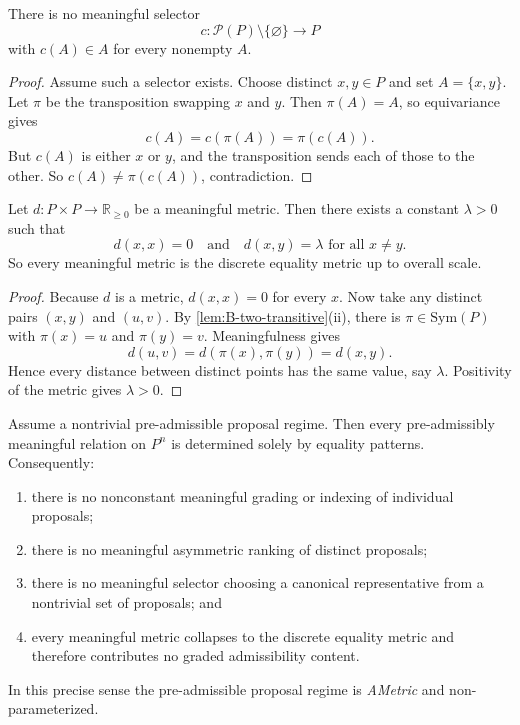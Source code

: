 \begin{proposition}
\label{prop:B-no-selector}
There is no meaningful selector
\[
c:\mathcal P(P)\setminus\{\varnothing\}\to P
\]
with $c(A)\in A$ for every nonempty $A$.
\end{proposition}

\begin{proof}
Assume such a selector exists. Choose distinct $x,y\in P$ and set $A=\{x,y\}$. Let $\pi$ be the transposition swapping $x$ and $y$. Then $\pi(A)=A$, so equivariance gives
\[
c(A)=c(\pi(A))=\pi(c(A)).
\]
But $c(A)$ is either $x$ or $y$, and the transposition sends each of those to the other. So $c(A)\neq \pi(c(A))$, contradiction.
\end{proof}

\begin{theorem}
\label{thm:B-metric-collapse}
Let $d:P\times P\to \mathbb R_{\ge 0}$ be a meaningful metric. Then there exists a constant $\lambda>0$ such that
\[
d(x,x)=0 \quad\text{and}\quad d(x,y)=\lambda \text{ for all } x\neq y.
\]
So every meaningful metric is the discrete equality metric up to overall scale.
\end{theorem}

\begin{proof}
Because $d$ is a metric, $d(x,x)=0$ for every $x$. Now take any distinct pairs $(x,y)$ and $(u,v)$. By \cref{lem:B-two-transitive}(ii), there is $\pi\in\mathrm{Sym}(P)$ with $\pi(x)=u$ and $\pi(y)=v$. Meaningfulness gives
\[
d(u,v)=d(\pi(x),\pi(y))=d(x,y).
\]
Hence every distance between distinct points has the same value, say $\lambda$. Positivity of the metric gives $\lambda>0$.
\end{proof}

\begin{theorem}
\label{thm:B-ametric}
Assume a nontrivial pre-admissible proposal regime. Then every pre-admissibly meaningful relation on $P^n$ is determined solely by equality patterns. Consequently:
\begin{enumerate}[label=(A\arabic*), leftmargin=2.8em]
    \item there is no nonconstant meaningful grading or indexing of individual proposals;
    \item there is no meaningful asymmetric ranking of distinct proposals;
    \item there is no meaningful selector choosing a canonical representative from a nontrivial set of proposals; and
    \item every meaningful metric collapses to the discrete equality metric and therefore contributes no graded admissibility content.
\end{enumerate}
In this precise sense the pre-admissible proposal regime is \emph{AMetric} and non-parameterized.
\end{theorem}

